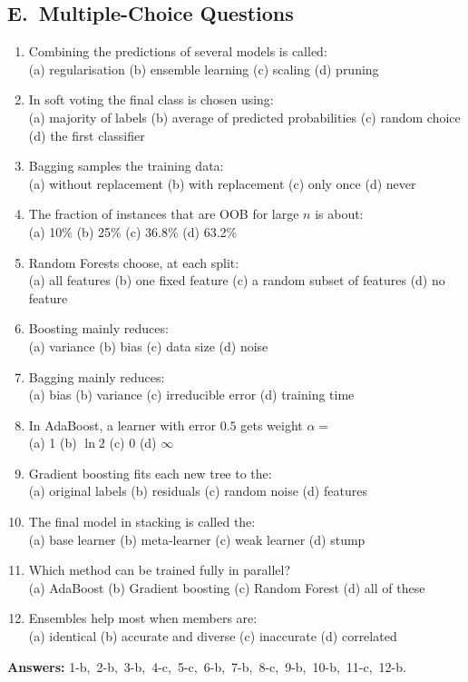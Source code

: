 \subsection*{E.\ Multiple-Choice Questions}
\begin{enumerate}
  \item Combining the predictions of several models is called: \\
  (a) regularisation \quad (b) ensemble learning \quad (c) scaling \quad (d) pruning
  \item In soft voting the final class is chosen using: \\
  (a) majority of labels \quad (b) average of predicted probabilities \quad (c) random choice \quad (d) the first classifier
  \item Bagging samples the training data: \\
  (a) without replacement \quad (b) with replacement \quad (c) only once \quad (d) never
  \item The fraction of instances that are OOB for large $n$ is about: \\
  (a) 10\% \quad (b) 25\% \quad (c) 36.8\% \quad (d) 63.2\%
  \item Random Forests choose, at each split: \\
  (a) all features \quad (b) one fixed feature \quad (c) a random subset of features \quad (d) no feature
  \item Boosting mainly reduces: \\
  (a) variance \quad (b) bias \quad (c) data size \quad (d) noise
  \item Bagging mainly reduces: \\
  (a) bias \quad (b) variance \quad (c) irreducible error \quad (d) training time
  \item In AdaBoost, a learner with error $0.5$ gets weight $\alpha=$ \\
  (a) 1 \quad (b) $\ln2$ \quad (c) 0 \quad (d) $\infty$
  \item Gradient boosting fits each new tree to the: \\
  (a) original labels \quad (b) residuals \quad (c) random noise \quad (d) features
  \item The final model in stacking is called the: \\
  (a) base learner \quad (b) meta-learner \quad (c) weak learner \quad (d) stump
  \item Which method can be trained fully in parallel? \\
  (a) AdaBoost \quad (b) Gradient boosting \quad (c) Random Forest \quad (d) all of these
  \item Ensembles help most when members are: \\
  (a) identical \quad (b) accurate and diverse \quad (c) inaccurate \quad (d) correlated
\end{enumerate}
\textbf{Answers:} 1-b,\ 2-b,\ 3-b,\ 4-c,\ 5-c,\ 6-b,\ 7-b,\ 8-c,\ 9-b,\ 10-b,\ 11-c,\ 12-b.

